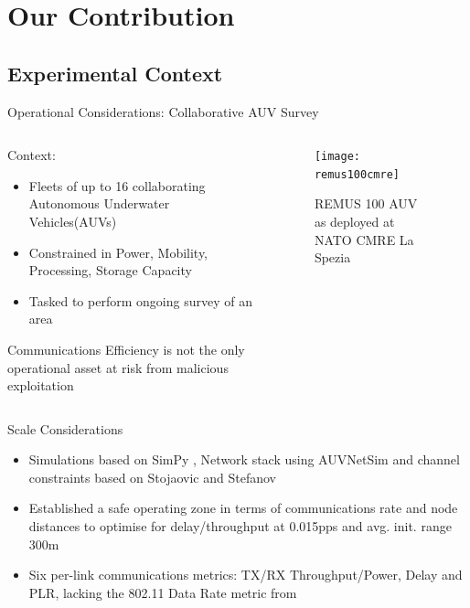 \documentclass{beamer}
\begin{document}
\section{Our Contribution}

\subsection{Experimental Context}
\begin{frame}{Operational Considerations: Collaborative AUV Survey}
  \begin{columns}
    \begin{column}{0.5\textwidth}
      Context:
      \begin{itemize}
        \item Fleets of up to 16 collaborating Autonomous Underwater Vehicles(AUVs)
        \item Constrained in Power, Mobility, Processing, Storage Capacity
        \item Tasked to perform ongoing survey of an area
      \end{itemize}

    Communications Efficiency is not the only operational asset at risk from malicious exploitation
      
    \end{column}
    \begin{column}{0.5\textwidth}
      \begin{figure}[h]
        \begin{center}
          \texttt{[image: remus100cmre]}
        \end{center}
        \caption{REMUS 100 AUV as deployed at NATO CMRE La Spezia}
        \label{fig:remus100cmre}
      \end{figure}
      
    \end{column}
  \end{columns}
\end{frame}

\begin{frame}{Scale Considerations}
  \begin{itemize}
    \item Simulations based on SimPy \cite{Mueller2003SimPy}, Network stack using AUVNetSim \cite{Miquel2008} and channel constraints based on Stojaovic and Stefanov \cite{Stojanovic2007,Stefanov2011}\hyperlink{tab:sysconstraints}{}
    \item Established a safe operating zone in terms of communications rate and node distances to optimise for delay/throughput at 0.015pps and avg. init. range 300m \hyperlink{eq:networkeffects}{}
    \item Six per-link communications metrics: TX/RX Throughput/Power, Delay and PLR, lacking the 802.11 Data Rate metric from \cite{Guo11}  
    
  \end{itemize}

\end{frame}
\end{document}
